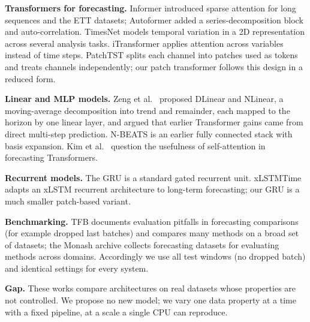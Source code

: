 \textbf{Transformers for forecasting.} Informer \cite{zhou2020informer} introduced sparse attention for long sequences and the ETT datasets; Autoformer \cite{wu2021autoformer} added a series-decomposition block and auto-correlation. TimesNet \cite{wu2022timesnet} models temporal variation in a 2D representation across several analysis tasks. iTransformer \cite{liu2023itransformer} applies attention across variables instead of time steps. PatchTST \cite{nie2022time} splits each channel into patches used as tokens and treats channels independently; our patch transformer follows this design in a reduced form.

\textbf{Linear and MLP models.} Zeng et al.\ \cite{zeng2022are} proposed DLinear and NLinear, a moving-average decomposition into trend and remainder, each mapped to the horizon by one linear layer, and argued that earlier Transformer gains came from direct multi-step prediction. N-BEATS \cite{oreshkin2019n} is an earlier fully connected stack with basis expansion. Kim et al.\ \cite{kim2024are} question the usefulness of self-attention in forecasting Transformers.

\textbf{Recurrent models.} The GRU \cite{cho2014learning} is a standard gated recurrent unit. xLSTMTime \cite{alharthi2024xlstmtime} adapts an xLSTM recurrent architecture to long-term forecasting; our GRU is a much smaller patch-based variant.

\textbf{Benchmarking.} TFB \cite{qiu2024tfb} documents evaluation pitfalls in forecasting comparisons (for example dropped last batches) and compares many methods on a broad set of datasets; the Monash archive \cite{godahewa2021monash} collects forecasting datasets for evaluating methods across domains. Accordingly we use all test windows (no dropped batch) and identical settings for every system.

\textbf{Gap.} These works compare architectures on real datasets whose properties are not controlled. We propose no new model; we vary one data property at a time with a fixed pipeline, at a scale a single CPU can reproduce.
